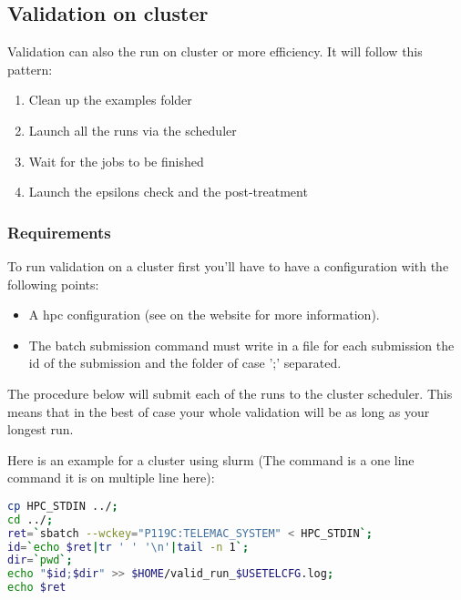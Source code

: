 \subsection{Validation on cluster}

Validation can also the run on cluster or more efficiency.
It will follow this pattern:
\begin{enumerate}
  \item Clean up the examples folder
  \item Launch all the \telma runs via the scheduler
  \item Wait for the jobs to be finished
  \item Launch the epsilons check and the post-treatment
\end{enumerate}

\subsubsection{Requirements}

To run validation on a cluster first you'll have to have a configuration with
the following points:
\begin{itemize}
  \item A hpc configuration (see on the website for more information).
  \item The batch submission command must write in a file for each submission
    the id of the submission and the folder of case ';' separated.
\end{itemize}

The procedure below will submit each of the \telma{} runs to the cluster
scheduler. This means that in the best of case your whole validation will be as
long as your longest \telma{} run.

Here is an example for a cluster using slurm (The command is a one line command
it is on multiple line here):
\begin{lstlisting}[language=bash]
cp HPC_STDIN ../;
cd ../;
ret=`sbatch --wckey="P119C:TELEMAC_SYSTEM" < HPC_STDIN`;
id=`echo $ret|tr ' ' '\n'|tail -n 1`;
dir=`pwd`;
echo "$id;$dir" >> $HOME/valid_run_$USETELCFG.log;
echo $ret
\end{lstlisting}

